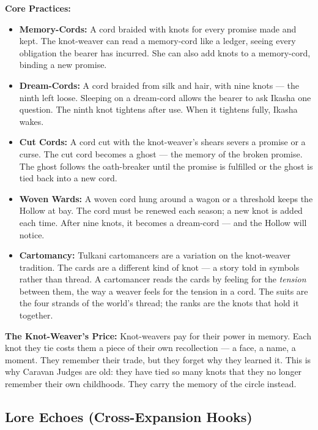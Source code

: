 \textbf{Core Practices:}
\begin{itemize}
    \item \textbf{Memory-Cords:} A cord braided with knots for every promise made and kept. The knot-weaver can read a memory-cord like a ledger, seeing every obligation the bearer has incurred. She can also add knots to a memory-cord, binding a new promise.
    \item \textbf{Dream-Cords:} A cord braided from silk and hair, with nine knots --- the ninth left loose. Sleeping on a dream-cord allows the bearer to ask Ikasha one question. The ninth knot tightens after use. When it tightens fully, Ikasha wakes.
    \item \textbf{Cut Cords:} A cord cut with the knot-weaver's shears severs a promise or a curse. The cut cord becomes a ghost --- the memory of the broken promise. The ghost follows the oath-breaker until the promise is fulfilled or the ghost is tied back into a new cord.
    \item \textbf{Woven Wards:} A woven cord hung around a wagon or a threshold keeps the Hollow at bay. The cord must be renewed each season; a new knot is added each time. After nine knots, it becomes a dream-cord --- and the Hollow will notice.
    \item \textbf{Cartomancy:} Tulkani cartomancers are a variation on the knot-weaver tradition. The cards are a different kind of knot --- a story told in symbols rather than thread. A cartomancer reads the cards by feeling for the \emph{tension} between them, the way a weaver feels for the tension in a cord. The suits are the four strands of the world's thread; the ranks are the knots that hold it together.
\end{itemize}

\textbf{The Knot-Weaver's Price:} Knot-weavers pay for their power in memory. Each knot they tie costs them a piece of their own recollection --- a face, a name, a moment. They remember their trade, but they forget why they learned it. This is why Caravan Judges are old: they have tied so many knots that they no longer remember their own childhoods. They carry the memory of the circle instead.

\subsection*{Lore Echoes (Cross-Expansion Hooks)}
\label{sec:tulkani-lore}

